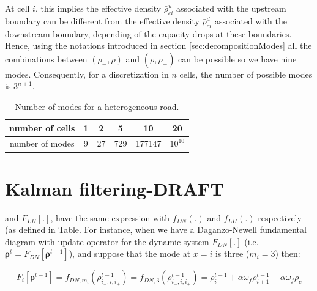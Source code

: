 At cell $i$, this implies the effective density $\bar{\rho}^{u}_{ci}$ associated with the upstream boundary can be different from the effective density $\bar{\rho}^{d}_{ci}$ associated with the downstream boundary, depending of the capacity drops at these boundaries. Hence, using the notations introduced in section \ref{sec:decompositionModes} all the combinations between $(\rho_{-},\rho)$ and $(\rho,\rho_{+})$ can be possible so we have nine modes. Consequently, for a discretization in $n$ cells, the number of possible modes is $3^{n+1}$.

\begin{table}[ht]
\centering %
\begin{tabular}{|c|c|c|c|c|c|}
  \hline
 number of cells & 1 & 2 & 5 & 10 & 20\\
  \hline
 number of modes & 9 & 27 & 729 & 177147 & $10^{10}$\\
  \hline
\end{tabular}
\label{table:numModes2} %
\caption{Number of modes for a heterogeneous road.}
\end{table}

\section{Kalman filtering-DRAFT}

and $F_{LH}[.]$, have the same expression with $f_{DN}(.)$ and $f_{LH}(.)$ respectively (as defined in Table. For instance, when we have a Daganzo-Newell fundamental diagram with update operator for the dynamic system $F_{DN}[.]$ (i.e. $\boldsymbol\rho^{t} = F_{DN}[\boldsymbol\rho^{t-1}]$), and suppose that the mode at $x=i$ is three ($m_{i}=3$) then\footnotemark: 

\begin{equation}
F_{i}[\boldsymbol\rho^{t-1}] = f_{DN,m_{i}}(\rho^{t-1}_{i_{-},i,i_{+}}) = f_{DN,3}(\rho^{t-1}_{i_{-},i,i_{+}}) = 
\rho^{t-1}_{i} + \alpha \omega_{f}\rho^{t-1}_{i+1} - \alpha \omega_{f}\rho_{c}
\label{eq:example}
\end{equation}



